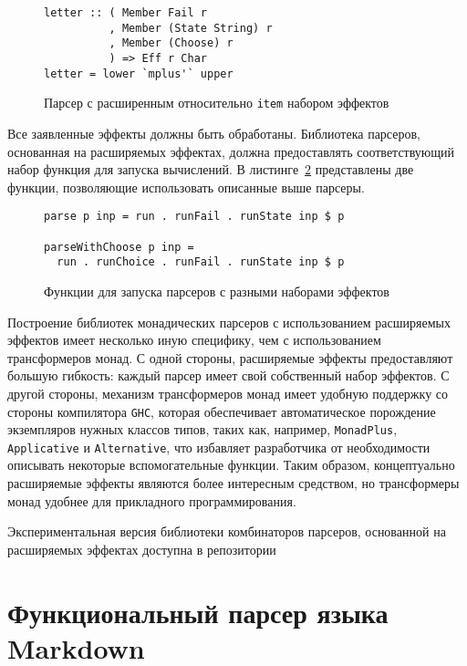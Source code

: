 \begin{figure}[t]
\begin{lstlisting}
letter :: ( Member Fail r
          , Member (State String) r
          , Member (Choose) r
          ) => Eff r Char
letter = lower `mplus'` upper
\end{lstlisting}
\caption{Парсер с расширенным относительно \lstinline{item} набором эффектов}
\label{listing:ExtEffectsMpus}
\end{figure}

Все заявленные эффекты должны быть обработаны. Библиотека парсеров, основанная
на расширяемых эффектах, должна предоставлять соответствующий набор функция
для запуска вычислений. В листинге~\ref{listing:ExtEffectsRunners} представлены
две функции, позволяющие использовать описанные выше парсеры.

\begin{figure}[t]
\begin{lstlisting}
parse p inp = run . runFail . runState inp $ p

parseWithChoose p inp =
  run . runChoice . runFail . runState inp $ p
\end{lstlisting}
\caption{Функции для запуска парсеров с разными наборами эффектов}
\label{listing:ExtEffectsRunners}
\end{figure}

Построение библиотек монадических парсеров с использованием расширяемых эффектов
имеет несколько иную специфику, чем с использованием трансформеров монад. С
одной стороны, расширяемые эффекты предоставляют большую гибкость: каждый парсер
имеет свой собственный набор эффектов. С другой стороны, механизм трансформеров
монад имеет удобную поддержку со стороны компилятора \lstinline{GHC}, которая
обеспечивает автоматическое порождение экземпляров нужных классов типов, таких
как, например, \lstinline{MonadPlus}, \lstinline{Applicative} и
\lstinline{Alternative}, что избавляет разработчика от необходимости описывать
некоторые вспомогательные функции. Таким образом, концептуально расширяемые
эффекты являются более интересным средством, но трансформеры монад удобнее для
прикладного программирования.

Экспериментальная версия библиотеки комбинаторов парсеров, основанной на
расширяемых эффектах доступна в репозитории~\cite{extEffParsers} 

\chapter{Функциональный парсер языка Markdown}

